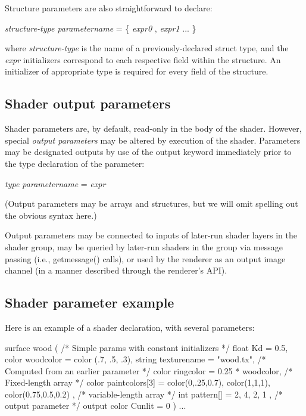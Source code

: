 \documentclass[11pt,letterpaper]{book}
\begin{document}
Structure parameters are also straightforward to declare:

\medskip
\spc \emph{structure-type parametername} {\cf = \{ } \emph{expr0}
  {\cf ,} \emph{expr1} ... {\cf \} }
\medskip

\noindent where \emph{structure-type} is the name of a
previously-declared {\cf struct} type, and the \emph{expr} initializers
correspond to each respective field within the structure.  An
initializer of appropriate type is required for every field of the
structure.

\subsection{Shader output parameters}
 

Shader parameters are, by default, read-only in the body of the
shader.  However, special \emph{output parameters} may be altered
by execution of the shader.  Parameters may be designated outputs
by use of the {\cf output} keyword immediately prior to the
type declaration of the parameter:

\medskip
{} \emph{type parametername} {\cf = } \emph{expr}
\medskip

\noindent (Output parameters may be arrays and structures, but we will
omit spelling out the obvious syntax here.)

Output parameters may be connected to inputs of later-run shader layers
in the shader group, may be queried by later-run shaders in the group
via message passing (i.e., {\cf getmessage()} calls), or used by the
renderer as an output image channel (in a manner described through the
renderer's API).

\subsection{Shader parameter example}

Here is an example of a shader declaration, with several parameters:

\begin{code}
    surface wood ( 
               /* Simple params with constant initializers */
                   float Kd = 0.5,
                   color woodcolor = color (.7, .5, .3),
                   string texturename = "wood.tx",
               /* Computed from an earlier parameter */
                   color ringcolor = 0.25 * woodcolor,
               /* Fixed-length array */
                   color paintcolors[3] = { color(0,.25,0.7), color(1,1,1),
                                            color(0.75,0.5,0.2) },
               /* variable-length array */
                   int pattern[] = { 2, 4, 2, 1 },
               /* output parameter */
                   output color Cunlit = 0
                 )
    {
       ...
    }
\end{code}
\end{document}
